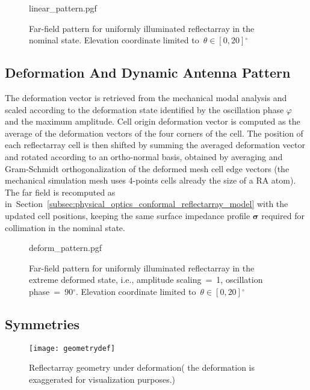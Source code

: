 \documentclass[11pt, a4paper]{scrartcl}
\newcommand{\sect}[1]{Section~\ref{#1}}
\newcommand{\degrees}{\ensuremath{^\circ}}
\begin{document}
    \begin{figure}[!bt]
        \centering
        {linear_pattern.pgf}
        \caption{Far-field pattern for uniformly illuminated reflectarray in the nominal state.
            Elevation coordinate limited to~$\theta \in [0,20]$\degrees
        }
        \label{fig:pattern}
    \end{figure}

    \subsection{Deformation And Dynamic Antenna Pattern}
    \label{subsec:deformation_model}
    The deformation vector is retrieved from the mechanical modal analysis and scaled according to the deformation state
    identified by the oscillation phase $\varphi$ and the maximum amplitude.
    Cell origin deformation vector is computed as the average of the deformation vectors of the four corners of the cell.
    The position of each reflectarray cell is then shifted by summing the averaged deformation vector and rotated
    according to an ortho-normal basis, obtained by averaging and Gram-Schmidt orthogonalization of the deformed mesh
    cell edge vectors (the mechanical simulation mesh uses 4-points cells already the size of a RA atom).
    The far field is recomputed as in~\sect{subsec:physical_optics_conformal_reflectarray_model} with the updated cell
    positions, keeping the same surface impedance profile $\mathbf{\sigma}$ required for collimation in the nominal state.
    \begin{figure}[!bt]
        \centering
        {deform_pattern.pgf}
        \caption{Far-field pattern for uniformly illuminated reflectarray in the extreme deformed state, i.e.,
            amplitude scaling~=~1, oscillation phase~=~90\degrees.
        Elevation coordinate limited to~$\theta \in [0,20]$\degrees}
        \label{fig:deformpattern}
    \end{figure}

    \subsection{Symmetries}
    \label{subsec:symmetries}
    \begin{figure}[!t]
        \texttt{[image: geometrydef]}
        \caption{Reflectarray geometry under deformation( the deformation is exaggerated for visualization purposes.)}
        \label{fig:radef}
    \end{figure}
\end{document}
